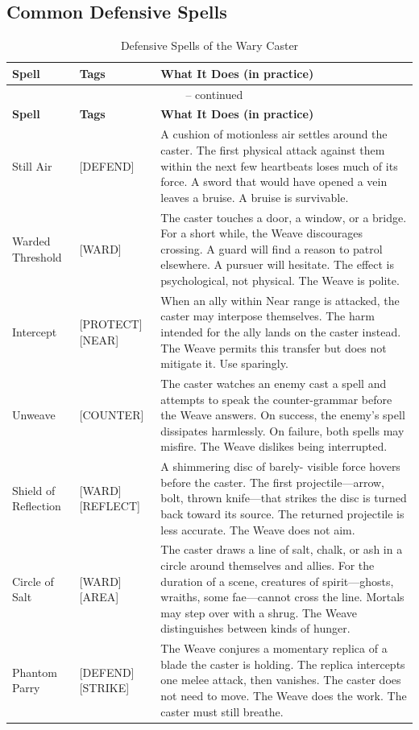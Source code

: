 \subsection{Common Defensive Spells}

\noindent
\begin{longtable}{p{} p{} p{}}
\caption{Defensive Spells of the Wary Caster}\\
\midrule
\textbf{Spell} & \textbf{Tags} & \textbf{What It Does (in practice)}\\
\midrule
\endfirsthead
\multicolumn{3}{c}{\tablename\ \thetable{} -- continued}\\
\midrule
\textbf{Spell} & \textbf{Tags} & \textbf{What It Does (in practice)}\\
\midrule
\endhead
Still Air & [DEFEND] & A cushion of motionless air settles around the caster. The first physical attack against them within the next few heartbeats loses much of its force. A sword that would have opened a vein leaves a bruise. A bruise is survivable. \\
Warded Threshold & [WARD] & The caster touches a door, a window, or a bridge. For a short while, the Weave discourages crossing. A guard will find a reason to patrol elsewhere. A pursuer will hesitate. The effect is psychological, not physical. The Weave is polite. \\
Intercept & [PROTECT][NEAR] & When an ally within Near range is attacked, the caster may interpose themselves. The harm intended for the ally lands on the caster instead. The Weave permits this transfer but does not mitigate it. Use sparingly. \\
Unweave & [COUNTER] & The caster watches an enemy cast a spell and attempts to speak the counter-grammar before the Weave answers. On success, the enemy's spell dissipates harmlessly. On failure, both spells may misfire. The Weave dislikes being interrupted. \\
Shield of Reflection & [WARD][REFLECT] & A shimmering disc of barely- visible force hovers before the caster. The first projectile---arrow, bolt, thrown knife---that strikes the disc is turned back toward its source. The returned projectile is less accurate. The Weave does not aim. \\
Circle of Salt & [WARD][AREA] & The caster draws a line of salt, chalk, or ash in a circle around themselves and allies. For the duration of a scene, creatures of spirit---ghosts, wraiths, some fae---cannot cross the line. Mortals may step over with a shrug. The Weave distinguishes between kinds of hunger. \\
Phantom Parry & [DEFEND][STRIKE] & The Weave conjures a momentary replica of a blade the caster is holding. The replica intercepts one melee attack, then vanishes. The caster does not need to move. The Weave does the work. The caster must still breathe. \\
\hline
\end{longtable}

